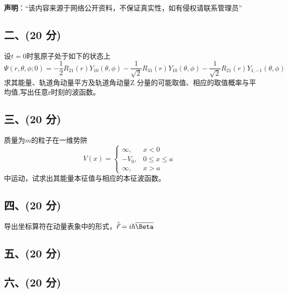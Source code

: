 
\textbf{声明}：“该内容来源于网络公开资料，不保证真实性，如有侵权请联系管理员”

\subsection{二、(20 分)}
设$t=0$时氢原子处于如下的状态上
$$\Psi(r, \theta, \phi; 0) = -\frac{1}{2} R_{21}(r) Y_{10} (\theta, \phi) - \frac{1}{\sqrt{2}} R_{31}(r) Y_{10} (\theta, \phi) - \frac{1}{\sqrt{2}} R_{21}(r) Y_{1,-1} (\theta, \phi)~$$
求其能量、轨道角动量平方及轨道角动量Z 分量的可能取值、相应的取值概率与平均值,写出任意r时刻的波函数。
\subsection{三、(20 分)}
质量为$m$的粒子在一维势阱
\[
V(x) = \begin{cases} 
\infty, & x < 0 \\
-V_0, & 0 \leq x \leq a \\
\infty, & x > a
\end{cases}~
\] 
中运动，试求出其能量本征值与相应的本征波函数。
\subsection{四、(20 分)}
导出坐标算符在动量表象中的形式，$\hat{\vec{r}}=i\hbar \overline{\Beta}$
\subsection{五、(20 分)}

\subsection{六、(20 分)}